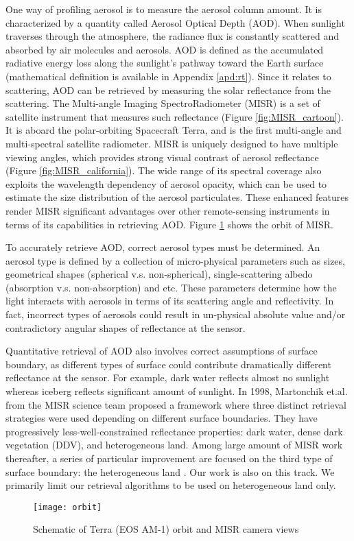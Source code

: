 One way of profiling aerosol is to measure the aerosol column amount. It is characterized by a quantity called Aerosol Optical Depth (AOD). When sunlight traverses through the atmosphere, the radiance flux is constantly scattered and absorbed by air molecules and aerosols. AOD is defined as the accumulated radiative energy loss along the sunlight's pathway toward the Earth surface (mathematical definition is available in Appendix \ref{apd:rt}).  Since it relates to scattering, AOD can be retrieved by measuring the solar reflectance from the scattering. The Multi-angle Imaging SpectroRadiometer (MISR) is a set of satellite instrument that measures such reflectance (Figure \ref{fig:MISR_cartoon}). It is aboard the polar-orbiting Spacecraft Terra, and is the first multi-angle and multi-spectral satellite radiometer. MISR is uniquely designed to have multiple viewing angles, which provides strong visual contrast of aerosol reflectance (Figure \ref{fig:MISR_california}). The wide range of its spectral coverage also exploits the wavelength dependency of aerosol opacity, which can be used to estimate the size distribution of the aerosol particulates. These enhanced features render MISR significant advantages over other remote-sensing instruments in terms of its capabilities in retrieving AOD. Figure \ref{fig:orbit} shows the orbit of MISR.

To accurately retrieve AOD, correct aerosol types must be determined. An aerosol type is defined by a collection of micro-physical parameters such as sizes, geometrical shapes (spherical v.s. non-spherical), single-scattering albedo (absorption v.s. non-absorption) and etc. These parameters determine how the light interacts with aerosols in terms of its scattering angle and reflectivity. In fact, incorrect types of aerosols could result in un-physical absolute value and/or contradictory angular shapes of reflectance at the sensor.

Quantitative retrieval of AOD also involves correct assumptions of surface boundary, as different types of surface could contribute dramatically different reflectance at the sensor. For example, dark water reflects almost no sunlight whereas iceberg reflects significant amount of sunlight. In 1998, Martonchik et.al. \cite{martonchik1998a} from the MISR science team proposed a framework where three distinct retrieval strategies were used depending on different surface boundaries. They have progressively less-well-constrained reflectance properties: dark water, dense dark vegetation (DDV), and heterogeneous land. Among large amount of MISR work thereafter, a series of particular improvement are focused on the third type of surface boundary: the heterogeneous land \cite{martonchik2002} \cite{diner2005} \cite{nancy_paper} \cite{taesup}. Our work is also on this track. We primarily limit our retrieval algorithms to be used on heterogeneous land only.

\begin{figure}[h!]
    \centering
    \texttt{[image: orbit]}
    \caption{Schematic of Terra (EOS AM-1) orbit and MISR camera views}
    \label{fig:orbit}
\end{figure}